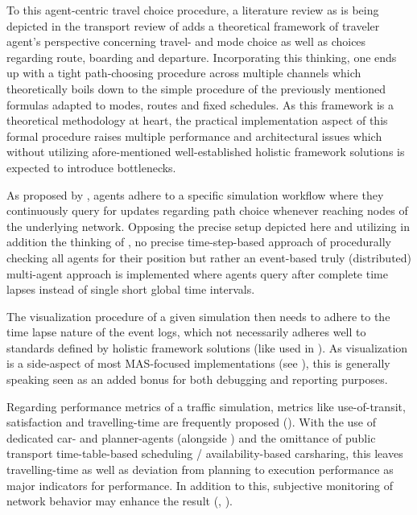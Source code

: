 To this agent-centric travel choice procedure, a literature review as is being depicted in the transport review of \cite{brakewood2018literature} adds a theoretical framework of traveler agent's perspective concerning travel- and mode choice as well as choices regarding route, boarding and departure. Incorporating this thinking, one ends up with a tight path-choosing procedure across multiple channels which theoretically boils down to the simple procedure of the previously mentioned formulas adapted to modes, routes and fixed schedules.
As this framework is a theoretical methodology at heart, the practical implementation aspect of this formal procedure raises multiple performance and architectural issues which without utilizing afore-mentioned well-established holistic framework solutions is expected to introduce bottlenecks.

As proposed by \cite{zargayouna2013agent}, agents adhere to a specific simulation workflow where they continuously query for updates regarding path choice whenever reaching nodes of the underlying network. Opposing the precise setup depicted here and utilizing in addition the thinking of \cite{mastio2015towards}, no precise time-step-based approach of procedurally checking all agents for their position but rather an event-based truly (distributed) multi-agent approach is implemented where agents query after complete time lapses instead of single short global time intervals. 

The visualization procedure of a given simulation then needs to adhere to the time lapse nature of the event logs, which not necessarily adheres well to standards defined by holistic framework solutions (like used in \cite{zargayouna2013agent}\cite{ksontini2016building}). As visualization is a side-aspect of most MAS-focused implementations (see \cite{mastio2015towards}), this is generally speaking seen as an added bonus for both debugging and reporting purposes.

Regarding performance metrics of a traffic simulation, metrics like use-of-transit, satisfaction and travelling-time are frequently proposed (\cite{brakewood2018literature}). With the use of dedicated car- and planner-agents (alongside \cite{zargayouna2013agent}) and the omittance of public transport time-table-based scheduling / availability-based carsharing, this leaves travelling-time as well as deviation from planning to execution performance as major indicators for performance.
In addition to this, subjective monitoring of network behavior may enhance the result (\cite{brakewood2018literature}, \cite{zargayouna2013agent}).
